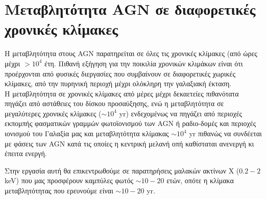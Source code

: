 
\section{Μεταβλητότητα \textlatin{AGN} σε διαφορετικές χρονικές κλίμακες}

Η μεταβλητότητα στους \textlatin{AGN} παρατηρείται σε όλες τις χρονικές κλίμακες (από ώρες μέχρι $>10^4$ έτη. Πιθανή εξήγηση για την ποικιλία χρονικών κλιμάκων είναι ότι προέρχονται από φυσικές διεργασίες που συμβαίνουν σε διαφορετικές χωρικές κλίμακες, από την πυρηνική περιοχή μέχρι ολόκληρη την γαλαξιακή έκταση.\\
Η μεταβλητότητα σε χρονικές κλίμακες από μέρες μέχρι δεκαετείες πιθανότατα πηγάζει από αστάθειες του δίσκου προσαύξησης, ενώ η μεταβλητότητα σε μεγαλύτερες χρονικές κλίμακες ($\sim 10^4$ \textlatin{yr}) ενδεχομένως να πηγάζει από περιοχές εκπομπής φασματικών γραμμών φωτοϊονισμού των \textlatin{AGN} ή ραδιο-δομές και περιοχές ιονισμού του Γαλαξία μας και μεταβλητότητα κλίμακας $\sim 10^4$ \textlatin{yr} πιθανώς να συνδέεται με φάσεις των \textlatin{AGN} κατά τις οποίες η κεντρική μελανή οπή καθίσταται ανενεργή κι έπειτα ενεργή\cite{Sartori_2018}.

Στην εργασία αυτή θα επικεντρωθούμε σε παρατηρήσεις μαλακών ακτίνων Χ ($0.2-2$ \textlatin{keV}) που μας προσφέρουν καμπύλες φωτός $\sim 10-20$ ετών, οπότε η κλίμακα μεταβλητότητας που ερευνούμε είναι $\sim 10-20$ \textlatin{yr}.


